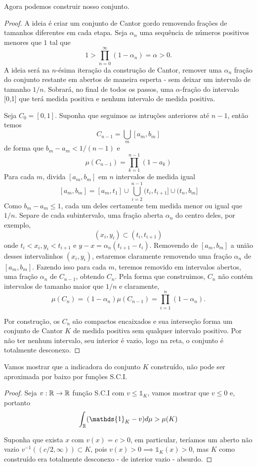 Agora podemos construir nosso conjunto.
\begin{proof}
    A ideia é criar um conjunto de Cantor gordo removendo frações de tamanhos diferentes em cada etapa. 
    Seja $\alpha_n$ uma sequência de números positivos menores que $1$ tal que
    $$ 1 > \prod_{n = 0}^{\infty} (1 - \alpha_n) = \alpha > 0.$$
    A ideia será na $n$-ésima iteração da construção de Cantor, remover uma $\alpha_n$ fração do conjunto restante em abertos de maneira esperta -
    sem deixar um intervalo de tamanho $1/n$.
    Sobrará, no final de todos os passos, uma $\alpha$-fração do intervalo [0,1] que terá medida positiva e nenhum intervalo de medida positiva.

    Seja $C_0 = [0,1]$. Suponha que seguimos as intruções anteriores até $n-1$, então temos 
    $$C_{n-1} = \bigcup_m [a_m, b_m]$$
    de forma que $b_m - a_m < 1/(n-1)$ e 
    $$\mu(C_{n-1}) = \prod_{k = 1}^{n-1} (1 - a_k)$$
    Para cada $m$, divida $[a_m, b_m]$ em $n$ intervalos de medida igual
    $$[a_m, b_m] = [a_m, t_1] \cup \bigcup_{i = 2}^{n-1} (t_i, t_{i+1}] \cup (t_n, b_m]$$
    Como $b_m - a_m \leq 1$, cada um deles certamente tem medida menor ou igual que $1/n$. Separe
    de cada subintervalo, uma fração aberta $\alpha_n$ do centro deles, por exemplo,
    $$(x_i,y_i) \subset (t_i, t_{i+1})$$
    onde $t_i < x_i,y_i < t_{i+1}$ e $y - x = \alpha_n (t_{i+1} - t_i)$.
    Removendo de $[a_m, b_m]$ a união desses intervalinhos $(x_i, y_i)$,
    estaremos claramente removendo uma fração $\alpha_n$ de $[a_m,b_m]$. Fazendo isso 
    para cada $m$, teremos removido em intervalos abertos, uma fração $\alpha_n$ de $C_{n-1}$, obtendo $C_n$.
    Pela forma que construimos, $C_n$ não contém intervalos de tamanho maior que $1/n$ e claramente,
    $$\mu(C_n) = (1-\alpha_n) \mu(C_{n-1}) = \prod_{i=1}^{n} (1-\alpha_n).$$
    
    Por construção, os $C_n$ são compactos encaixados e sua interseção forma um conjunto de Cantor $K$ de medida positiva sem 
    qualquer intervalo positivo. Por não ter nenhum intervalo, seu interior é vazio, logo na reta, o conjunto é totalmente desconexo.
\end{proof}
Vamos mostrar que a indicadora do conjunto $K$ construído, não pode ser aproximada por baixo por funções S.C.I.
\begin{proof}
    Seja $v : \mathbb{R} \rightarrow \mathbb{R}$ função S.C.I com $v \leq \mathds{1}_K$, vamos mostrar que $v \leq 0$ e, portanto
    $$\int_\R  (\mathds{1}_K - v) d\mu > \mu(K) $$

    Suponha que exista $x$ com $v(x) = c > 0$, em particular, teríamos um aberto não vazio $v^{-1}((c/2,\infty)) \subset K$,
    pois $v(x) > 0 \implies \mathds{1}_K(x) > 0$, mas $K$ como construído era totalmente desconexo - de interior vazio - absurdo.
\end{proof}


